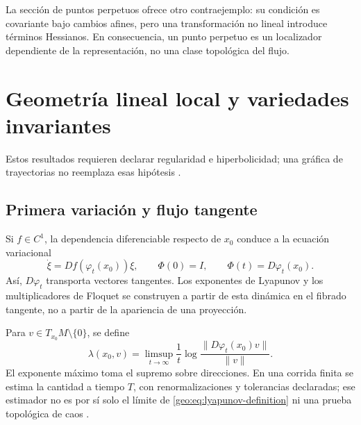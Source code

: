 La sección de puntos perpetuos ofrece otro contraejemplo: su condición es
covariante bajo cambios afines, pero una transformación no lineal introduce
términos Hessianos. En consecuencia, un punto perpetuo es un localizador
dependiente de la representación, no una clase topológica del flujo.

\fi
\HAFOGeoRenderBlocktrue
\ifdefined\HAFOGeoBlockSelect
  \HAFOGeoRenderBlockfalse
  \ifdefined\HAFOGeoBlockLinear\HAFOGeoRenderBlocktrue\fi
\fi
\ifHAFOGeoRenderBlock
\HAFOStudyNeedspace
\section{Geometría lineal local y variedades invariantes}
\label{sec:geo-stable-manifolds}

\HAFOCardLinearGeometry

Estos resultados requieren declarar regularidad e
hiperbolicidad; una gráfica de trayectorias no reemplaza esas hipótesis
\cite{JaurezEtAl2021TGEDI,JaurezEtAl2021TGEDII,HirschSmaleDevaney2013}.

\subsection{Primera variación y flujo tangente}

Si \(f\in C^1\), la dependencia diferenciable respecto de \(x_0\) conduce a
la ecuación variacional
\begin{equation}
 \dot\xi=Df(\varphi_t(x_0))\xi,
 \qquad \Phi(0)=I,\qquad
 \Phi(t)=D\varphi_t(x_0).
 \label{geo:eq:variational}
\end{equation}
Así, \(D\varphi_t\) transporta vectores tangentes. Los exponentes de Lyapunov
y los multiplicadores de Floquet se construyen a partir de esta dinámica en
el fibrado tangente, no a partir de la apariencia de una proyección.

\begin{definition}
Para \(v\in T_{x_0}M\setminus\{0\}\), se define
\begin{equation}
 \lambda(x_0,v)=\limsup_{t\to\infty}
 \frac{1}{t}\log\frac{\|D\varphi_t(x_0)v\|}{\|v\|}.
 \label{geo:eq:lyapunov-definition}
\end{equation}
El exponente máximo toma el supremo sobre direcciones. En una corrida finita
se estima la cantidad a tiempo \(T\), con renormalizaciones y tolerancias
declaradas; ese estimador no es por sí solo el límite de
\cref{geo:eq:lyapunov-definition} ni una prueba topológica de caos
\cite{Skokos2010,DatserisParlitz2022Nonlinear}.
\end{definition}

